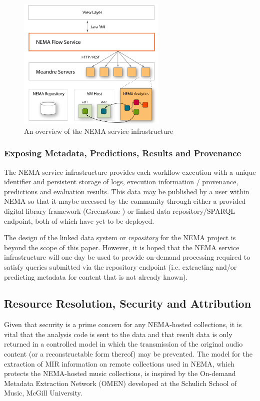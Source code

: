 \documentclass[conference]{IEEEtran}
\begin{document}
\begin{figure}[t]
\centering
\includegraphics[width=2.8in]{infrastructure}
  \caption{An overview of the NEMA service infrastructure}
\label{fig_infrastructure}
\end{figure}

\subsubsection{Exposing Metadata, Predictions, Results and Provenance}
The NEMA service infrastructure provides each workflow execution with a unique identifier and persistent storage of logs, execution information / provenance, predictions and evaluation results. This data may be published by a user within NEMA so that it maybe accessed by the community through either a provided digital library framework (Greenstone \cite{witten2000greenstone}) or linked data repository/SPARQL endpoint, both of which have yet to be deployed.

The design of the linked data system or \emph{repository} for the NEMA project is beyond the scope of this paper. However, it is hoped that the NEMA service infrastructure will one day be used to provide on-demand processing required to satisfy queries submitted via the repository endpoint (i.e. extracting and/or predicting metadata for content that is not already known).

\subsection{Resource Resolution, Security and Attribution}
Given that security is a prime concern for any NEMA-hosted collections, it is vital that the analysis code is sent to the data and that result data is only returned in a controlled model in which the transmission of the original audio content (or a reconstructable form thereof) may be prevented.
The model for the extraction of MIR information on remote collections used in NEMA, which protects the NEMA-hosted music collections, is inspired by the On-demand Metadata Extraction Network (OMEN) \cite{mcennis2006overview} developed at the Schulich School of Music, McGill University.
\end{document}
